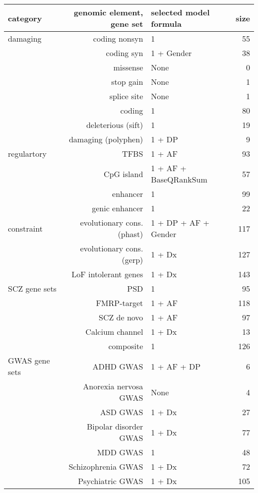 \documentclass[letterpaper]{article}
\begin{document}
\begin{tabular}{lrlr}
category & genomic element, gene set & selected model formula & size \\
\hline
\hline
damaging & coding nonsyn & 1 & 55 \\
& coding syn & 1 + Gender & 38 \\
& missense & None & 0 \\
& stop gain & None & 1 \\
& splice site & None & 1 \\
& coding & 1 & 80 \\
& deleterious (sift) & 1 & 19 \\
& damaging (polyphen) & 1 + DP & 9 \\
\hline
regulartory & TFBS & 1 + AF & 93 \\
& CpG island & 1 + AF + BaseQRankSum & 57 \\
& enhancer & 1 & 99 \\
& genic enhancer & 1 & 22 \\
\hline
constraint & evolutionary cons. (phast) & 1 + DP + AF + Gender & 117 \\
& evolutionary cons. (gerp) & 1 + Dx & 127 \\
& LoF intolerant genes & 1 + Dx & 143 \\
\hline
SCZ gene sets & PSD & 1 & 95 \\
& FMRP-target & 1 + AF & 118 \\
& SCZ de novo & 1 + AF & 97 \\
& Calcium channel & 1 + Dx & 13 \\
& composite & 1 & 126 \\
\hline
GWAS gene sets & ADHD GWAS & 1 + AF + DP & 6 \\
& Anorexia nervosa GWAS & None & 4 \\
& ASD GWAS & 1 + Dx & 27 \\
& Bipolar disorder GWAS & 1 + Dx & 77 \\
& MDD GWAS & 1 & 48 \\
& Schizophrenia GWAS & 1 + Dx & 72 \\
& Psychiatric GWAS & 1 + Dx & 105 \\
\end{tabular}
\end{document}
